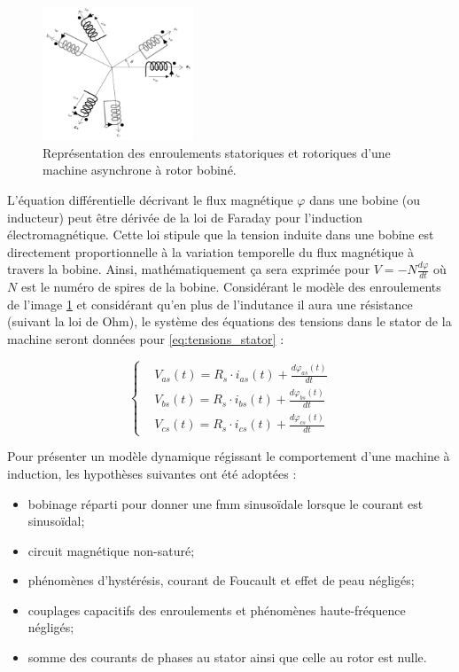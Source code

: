 \begin{figure}[!h]
    \centering
    \includegraphics[width=0.4\textwidth]{book_imgs/stator_rotor.png} 
    \caption{Représentation des enroulements statoriques et rotoriques d'une machine asynchrone à rotor bobiné.}
    \label{img-stator_rotor}
\end{figure}

L'équation différentielle décrivant le flux magnétique $\varphi$ dans une bobine (ou inducteur) peut être dérivée de la loi de Faraday pour l'induction électromagnétique. Cette loi stipule que la tension induite dans une bobine est directement proportionnelle à la variation temporelle du flux magnétique à travers la bobine. Ainsi, mathématiquement ça sera exprimée pour $V = -N\frac{d\varphi}{dt}$ où $N$ est le numéro de spires de la bobine. Considérant le modèle des enroulements de l'image \ref{img-stator_rotor} et considérant qu'en plus de l'indutance il aura une résistance (suivant la loi de Ohm), le système des équations des tensions dans le stator de la machine seront données pour \ref{eq:tensions_stator} : 

\begin{equation}
    \left\{
    \begin{align}
        &V_{as}(t) = R_s \cdot i_{as}(t) + \frac{d \varphi_{as}(t)}{dt} \\
        &V_{bs}(t) = R_s \cdot i_{bs}(t) + \frac{d \varphi_{bs}(t)}{dt} \\
        &V_{cs}(t) = R_s \cdot i_{cs}(t) + \frac{d \varphi_{cs}(t)}{dt}
    \end{align} \right.
    \label{eq:tensions_stator}
\end{equation}


Pour présenter un modèle dynamique régissant le comportement d'une machine à induction, les hypothèses suivantes ont été adoptées :

\begin{itemize}
    \item bobinage réparti pour donner une fmm sinusoïdale lorsque le courant est sinusoïdal;
    \item circuit magnétique non-saturé;
    \item phénomènes d’hystérésis, courant de Foucault et effet de peau négligés;
    \item couplages capacitifs des enroulements et phénomènes haute-fréquence négligés;
    \item somme des courants de phases au stator ainsi que celle au rotor est nulle.
\end{itemize}

